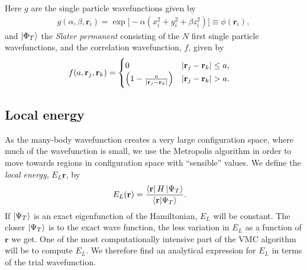 \documentclass[
    a4paper, aps, twocolumn, floatfix, superscriptaddress]{revtex4-1}
\newcommand{\vf}{\mathbf}
\newcommand{\1}{\mathds{1}}
\begin{document}
    Here $g$ are the single particle wavefunctions given by
    \begin{align}
        g(\alpha, \beta, \vf{r}_i)
        = \exp\bigl[
            -\alpha(x_i^2 + y_i^2 + \beta z_i^2)
        \bigr] \equiv \phi(\vf{r}_i),
    \end{align}
    and $\ket{\Phi_T}$ the \textit{Slater permanent} consisting of the $N$ first
    single particle wavefunctions, and the correlation wavefunction, $f$, given
    by
    \begin{align}
        f(a, \vf{r}_j, \vf{r}_k)
        &=
        \begin{cases}
            0 & |\vf{r}_j - \vf{r}_k| \leq a, \\
            \Bigl(
                1 - \frac{a}{|\vf{r}_j - \vf{r}_k|}
            \Bigr) & |\vf{r}_j - \vf{r}_k| > a.
        \end{cases}
    \end{align}

    \subsection{Local energy}
        As the many-body wavefunction creates a very large configuration space,
        where much of the wavefunction is small, we use the Metropolis algorithm
        in order to move towards regions in configuration space with
        ``sensible'' values. We define the \textit{local energy}, $E_L{\vf{r}}$,
        by
        \begin{align}
            E_L(\vf{r})
            &= \frac{\bra{\vf{r}}H\ket{\Psi_T}}{\bra{\vf{r}}\ket{\Psi_T}}.
        \end{align}
        If $\ket{\Psi_T}$ is an exact eigenfunction of the Hamiltonian, $E_L$
        will be constant. The closer $\ket{\Psi_T}$ is to the exact wave
        function, the less variation in $E_L$ as a function of $\vf{r}$ we get.
        One of the most computationally intensive part of the VMC algorithm will
        be to compute $E_L$. We therefore find an analytical expression for
        $E_L$ in terms of the trial wavefunction.
\end{document}
